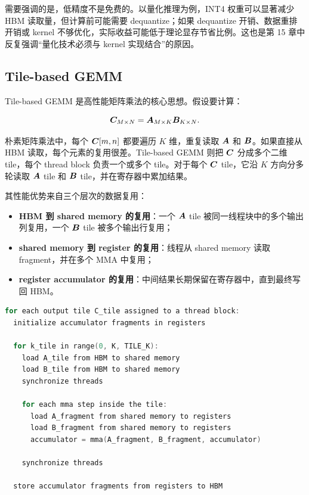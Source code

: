 需要强调的是，低精度不是免费的。以量化推理为例，INT4 权重可以显著减少 HBM 读取量，但计算前可能需要 dequantize；如果 dequantize 开销、数据重排开销或 kernel 不够优化，实际收益可能低于理论显存节省比例。这也是第 15 章中反复强调“量化技术必须与 kernel 实现结合”的原因。

\subsection{Tile-based GEMM}
\label{subsec:tile-based-gemm}

Tile-based GEMM 是高性能矩阵乘法的核心思想。假设要计算：

\[
  \bm{C}_{M \times N} = \bm{A}_{M \times K}\bm{B}_{K \times N}.
\]

朴素矩阵乘法中，每个 $\bm{C}[m,n]$ 都要遍历 $K$ 维，重复读取 $\bm{A}$ 和 $\bm{B}$。如果直接从 HBM 读取，每个元素的复用很差。Tile-based GEMM 则把 $\bm{C}$ 分成多个二维 tile，每个 thread block 负责一个或多个 tile。对于每个 $\bm{C}$ tile，它沿 $K$ 方向分多轮读取 $\bm{A}$ tile 和 $\bm{B}$ tile，并在寄存器中累加结果。

其性能优势来自三个层次的数据复用：

\begin{itemize}
  \item \textbf{HBM 到 shared memory 的复用}：一个 $\bm{A}$ tile 被同一线程块中的多个输出列复用，一个 $\bm{B}$ tile 被多个输出行复用；
  \item \textbf{shared memory 到 register 的复用}：线程从 shared memory 读取 fragment，并在多个 MMA 中复用；
  \item \textbf{register accumulator 的复用}：中间结果长期保留在寄存器中，直到最终写回 HBM。
\end{itemize}

\begin{lstlisting}[language=C++,caption={高度简化的 tiled GEMM 伪代码},label={lst:tiled-gemm-pseudo}]
for each output tile C_tile assigned to a thread block:
  initialize accumulator fragments in registers

  for k_tile in range(0, K, TILE_K):
    load A_tile from HBM to shared memory
    load B_tile from HBM to shared memory
    synchronize threads

    for each mma step inside the tile:
      load A_fragment from shared memory to registers
      load B_fragment from shared memory to registers
      accumulator = mma(A_fragment, B_fragment, accumulator)

    synchronize threads

  store accumulator fragments from registers to HBM
\end{lstlisting}

